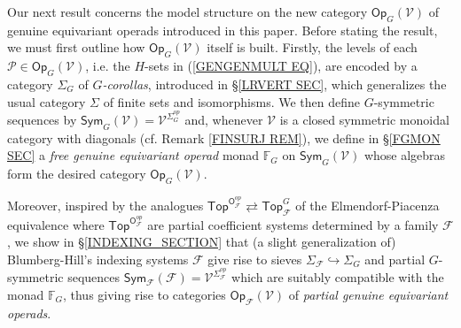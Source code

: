\documentclass[a4paper,10pt]{article}%
\begin{document}

Our next result concerns the model structure
on the new category 
$\mathsf{Op}_G (\mathcal{V})$ of genuine equivariant operads
introduced in this paper. Before stating the result, we must first outline how 
$\mathsf{Op}_G (\mathcal{V})$
itself is built.
Firstly, the levels of each 
$\mathcal{P} \in \mathsf{Op}_G(\mathcal{V})$,
i.e. the $H$-sets in (\ref{GENGENMULT EQ}),
are encoded by a category $\Sigma_G$ of 
\textit{$G$-corollas}, introduced in \S \ref{LRVERT SEC},
which generalizes the usual category 
$\Sigma$ of finite sets and isomorphisms.
We then define $G$-symmetric sequences by
$\mathsf{Sym}_G(\mathcal{V})=
\mathcal{V}^{\Sigma_G^{op}}$ and,
whenever $\mathcal{V}$ is a closed symmetric monoidal category with diagonals 
(cf. Remark \ref{FINSURJ REM}),
we define in \S \ref{FGMON SEC}
a \textit{free genuine equivariant operad} monad 
$\mathbb{F}_G$ on 
$\mathsf{Sym}_G(\mathcal{V})$
whose algebras form the desired category 
$\mathsf{Op}_G(\mathcal{V})$.

Moreover, inspired by the analogues
$\mathsf{Top}^{\mathsf{O}_{\mathcal{F}}^{op}}
	\rightleftarrows 
\mathsf{Top}^G_{\mathcal{F}}$
of the Elmendorf-Piacenza equivalence
where 
$\mathsf{Top}^{\mathsf{O}_{\mathcal{F}}^{op}}$
are partial coefficient systems determined by a family $\mathcal{F}$, 
we show in \S \ref{INDEXING_SECTION}
that (a slight generalization of)
Blumberg-Hill's indexing systems $\mathcal{F}$
give rise to sieves 
$\Sigma_{\mathcal{F}} \hookrightarrow \Sigma_G$
and partial $G$-symmetric sequences
$\mathsf{Sym_{\mathcal{F}}}(\mathcal{F})
=
\mathcal{V}^{\Sigma_{\mathcal{F}}^{op}}$ which are suitably compatible with the monad
$\mathbb{F}_G$,
thus giving rise to categories
$\mathsf{Op}_{\mathcal{F}}(\mathcal{V})$
of \textit{partial genuine equivariant operads}.
\end{document}
